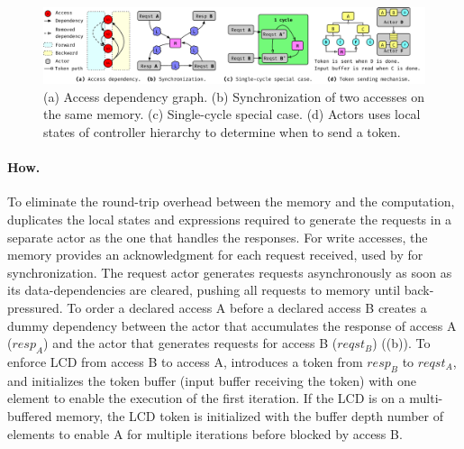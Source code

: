 \begin{figure}
\centering
\includegraphics[width=1.0\textwidth]{figs/synch_mech.pdf}
\caption{
    (a) Access dependency graph.
    (b) Synchronization of two accesses on the same memory.
    (c) Single-cycle special case.
    (d) Actors uses local states of controller hierarchy to determine when to send a token.
}\label{fig:depgraph}\label{fig:token}\label{fig:tokentrick}\label{fig:tokenwhen}
\end{figure}

\paragraph{How.} 

To eliminate the round-trip overhead between the memory and the computation, 
\name{} duplicates the local states and expressions required to generate the requests in a separate actor as the one that handles the responses.
For write accesses, the memory provides an acknowledgment for each request received, used by \name for synchronization.
The request actor generates requests asynchronously as soon as its data-dependencies are cleared, pushing all requests to memory until back-pressured.
To order a declared access A before a declared access B
\name creates a dummy dependency between the actor that accumulates the response of access A ($resp_A$) and the actor that generates requests for access B ($reqst_B$) ((b)).
To enforce LCD from access B to access A, \name introduces a token from $resp_B$ to $reqst_A$, and initializes the token buffer (input buffer receiving the token) with one element to enable the execution of the first iteration.
If the LCD is on a multi-buffered memory, the LCD token is initialized with the buffer depth number of elements to enable A for multiple iterations before blocked by access B.

